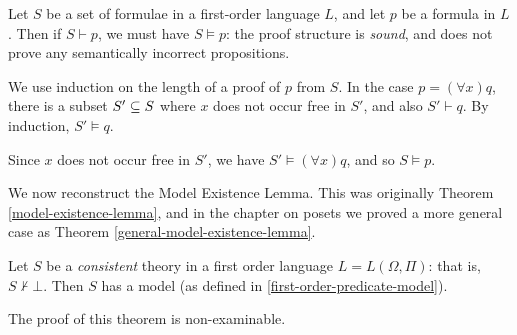 \documentclass{article}
\begin{document}
\begin{theorem}
	\label{first-order-soundness-theorem}
    Let $S$ be a set of formulae in a first-order language $L$, and let $p$ be a formula in $L$. Then if $S \vdash p$, we must have $S \vDash p$: the proof structure is \textit{sound}, and does not prove any semantically incorrect propositions.
\end{theorem}

\begin{prf}
    We use induction on the length of a proof of $p$ from $S$. In the case $p = (\forall x) q$, there is a subset $S' \subseteq S$ where $x$ does not occur free in $S'$, and also $S' \vdash q$. By induction, $S' \vDash q$.
    
    Since $x$ does not occur free in $S'$, we have $S' \vDash (\forall x) q$, and so $S \vDash p$.
\end{prf}

We now reconstruct the Model Existence Lemma. This was originally Theorem \ref{model-existence-lemma}, and in the chapter on posets we proved a more general case as Theorem \ref{general-model-existence-lemma}.

\begin{theorem}
	\label{first-order-model-existence-lemma}
    Let $S$ be a \textit{consistent} theory in a first order language $L = L(\Omega, \Pi)$: that is, $S \not\vdash \bot$. Then $S$ has a model (as defined in \ref{first-order-predicate-model}).
\end{theorem}

\begin{note}
	The proof of this theorem is non-examinable.
\end{note}
\end{document}
